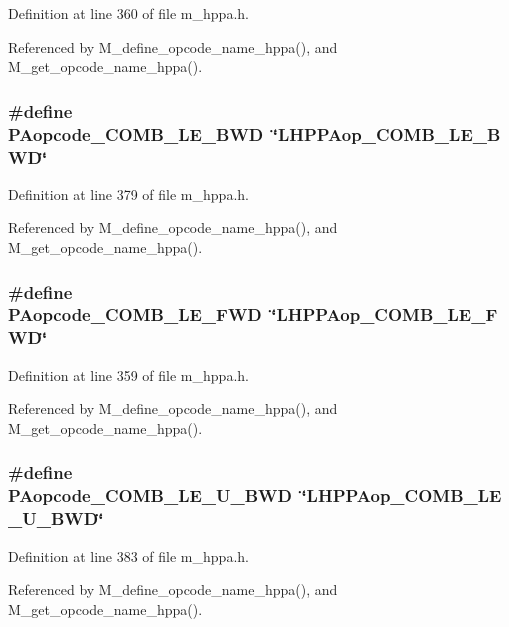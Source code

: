 Definition at line 360 of file m\_\-hppa.h.

Referenced by M\_\-define\_\-opcode\_\-name\_\-hppa(), and M\_\-get\_\-opcode\_\-name\_\-hppa().
\subsubsection{\setlength{\rightskip}{0pt plus 5cm}\#define PAopcode\_\-COMB\_\-LE\_\-BWD~\char`\"{}LHPPAop\_\-COMB\_\-LE\_\-BWD\char`\"{}}\label{m__hppa_8h_d86159b8cd4dd18c9e89a0ba6526d2ef}




Definition at line 379 of file m\_\-hppa.h.

Referenced by M\_\-define\_\-opcode\_\-name\_\-hppa(), and M\_\-get\_\-opcode\_\-name\_\-hppa().
\subsubsection{\setlength{\rightskip}{0pt plus 5cm}\#define PAopcode\_\-COMB\_\-LE\_\-FWD~\char`\"{}LHPPAop\_\-COMB\_\-LE\_\-FWD\char`\"{}}\label{m__hppa_8h_f96ff38b3a6bc65280ebc2f44cda1b84}




Definition at line 359 of file m\_\-hppa.h.

Referenced by M\_\-define\_\-opcode\_\-name\_\-hppa(), and M\_\-get\_\-opcode\_\-name\_\-hppa().
\subsubsection{\setlength{\rightskip}{0pt plus 5cm}\#define PAopcode\_\-COMB\_\-LE\_\-U\_\-BWD~\char`\"{}LHPPAop\_\-COMB\_\-LE\_\-U\_\-BWD\char`\"{}}\label{m__hppa_8h_e15b35464af8e14ca54e55508864d8f6}




Definition at line 383 of file m\_\-hppa.h.

Referenced by M\_\-define\_\-opcode\_\-name\_\-hppa(), and M\_\-get\_\-opcode\_\-name\_\-hppa().
